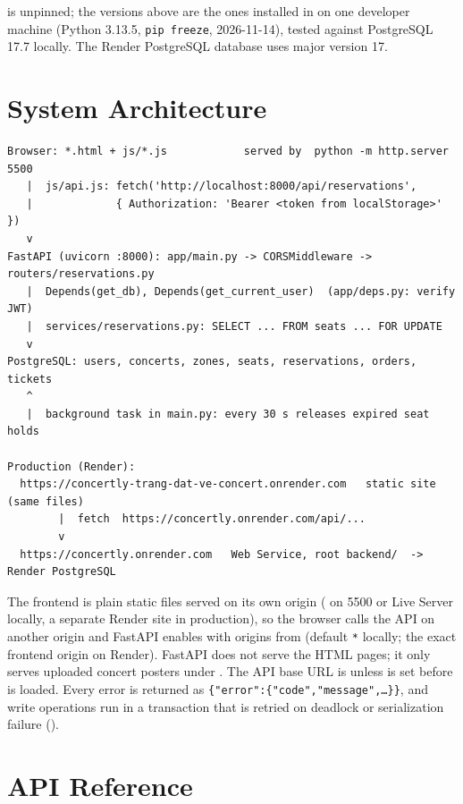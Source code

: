 \documentclass[11pt,a4paper]{article}
\newcommand{\code}[1]{\begingroup\let\codeus\_\renewcommand{\_}{\codeus\allowbreak}\texttt{#1}\endgroup}
\begin{document}
 is unpinned; the versions above are the ones installed in
 on one developer machine (Python 3.13.5, \code{pip freeze}, 2026-11-14),
tested against PostgreSQL 17.7 locally. The Render PostgreSQL database uses major version 17.


\section{System Architecture}

\begin{lstlisting}
Browser: *.html + js/*.js            served by  python -m http.server 5500
   |  js/api.js: fetch('http://localhost:8000/api/reservations',
   |             { Authorization: 'Bearer <token from localStorage>' })
   v
FastAPI (uvicorn :8000): app/main.py -> CORSMiddleware -> routers/reservations.py
   |  Depends(get_db), Depends(get_current_user)  (app/deps.py: verify JWT)
   |  services/reservations.py: SELECT ... FROM seats ... FOR UPDATE
   v
PostgreSQL: users, concerts, zones, seats, reservations, orders, tickets
   ^
   |  background task in main.py: every 30 s releases expired seat holds

Production (Render):
  https://concertly-trang-dat-ve-concert.onrender.com   static site (same files)
        |  fetch  https://concertly.onrender.com/api/...
        v
  https://concertly.onrender.com   Web Service, root backend/  ->  Render PostgreSQL
\end{lstlisting}

The frontend is plain static files served on its own origin ( on 5500 or Live
Server locally, a separate Render site in production), so the browser calls the API on another
origin and FastAPI enables  with origins from  (default
\code{*} locally; the exact frontend origin on Render). FastAPI does not serve the HTML pages; it
only serves uploaded concert posters under . The API base URL
is  unless  is set before
 is loaded. Every
error is returned as \code{\{"error":\{"code","message",\ldots\}\}}, and write operations run in a
transaction that is retried on deadlock or serialization failure ().


\section{API Reference}
\end{document}
